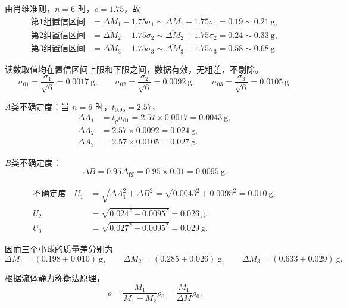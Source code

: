 \documentclass[12pt,a4paper,fontset=windows]{ctexart}
\begin{document}
由肖维准则，$n=6$ 时，$c=1.75$，故
\begin{align*}
    \text{第1组置信区间}&=\overline{\Delta M}_1-1.75\sigma_1
        \sim\overline{\Delta M}_1+1.75\sigma_1=0.19\sim0.21\ \mathrm{g},\\
    \text{第2组置信区间}&=\overline{\Delta M}_2-1.75\sigma_2
        \sim\overline{\Delta M}_2+1.75\sigma_2=0.24\sim0.33\ \mathrm{g},\\
    \text{第3组置信区间}&=\overline{\Delta M}_3-1.75\sigma_3
        \sim\overline{\Delta M}_3+1.75\sigma_3=0.58\sim0.68\ \mathrm{g}.
\end{align*}

读数取值均在置信区间上限和下限之间，数据有效，无粗差，不剔除。
\begin{equation*}
    \sigma_{01}=\frac{\sigma_1}{\sqrt{6}}=0.0017\ \mathrm{g},\qquad
    \sigma_{02}=\frac{\sigma_2}{\sqrt{6}}=0.0092\ \mathrm{g},\qquad
    \sigma_{03}=\frac{\sigma_3}{\sqrt{6}}=0.0105\ \mathrm{g}.
\end{equation*}

$A$类不确定度：当 $n=6$ 时，$t_{0.95}=2.57$，
\begin{align*}
    \Delta A_1&=t_p\sigma_{01}=2.57\times0.0017=0.0043\ \mathrm{g},\\
    \Delta A_2&=2.57\times0.0092=0.024\ \mathrm{g},\\
    \Delta A_3&=2.57\times0.0105=0.027\ \mathrm{g}.
\end{align*}

$B$类不确定度：
\begin{equation*}
    \Delta B=0.95\Delta_{\text{仪}}=0.95\times0.01=0.0095\ \mathrm{g}.
\end{equation*}

\begin{align*}
    \text{不确定度}\quad
    U_1&=\sqrt{\Delta A_1^2+\Delta B^2}
        =\sqrt{0.0043^2+0.0095^2}=0.010\ \mathrm{g},\\
    U_2&=\sqrt{0.024^2+0.0095^2}=0.026\ \mathrm{g},\\
    U_3&=\sqrt{0.027^2+0.0095^2}=0.029\ \mathrm{g}.
\end{align*}

因而三个小球的质量差分别为
\begin{equation*}
    \Delta M_1=(0.198\pm0.010)\ \mathrm{g},\qquad
    \Delta M_2=(0.285\pm0.026)\ \mathrm{g},\qquad
    \Delta M_3=(0.633\pm0.029)\ \mathrm{g}.
\end{equation*}

根据流体静力称衡法原理，
\begin{equation*}
    \rho=\frac{M_1}{M_1-M_2}\rho_0=\frac{M_1}{\Delta M}\rho_0.
\end{equation*}
\end{document}
